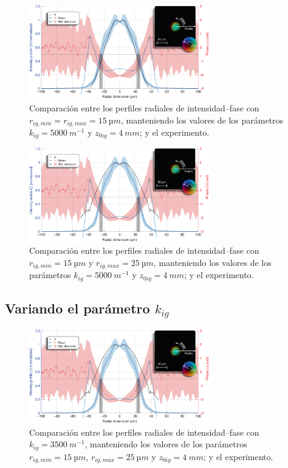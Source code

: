 \newpage

\begin{figure}[htbp]
  \centering
  \includegraphics[width=0.7\textwidth]{Figuras/anx_cmp_69.png}
  \caption*{Comparación entre los perfiles radiales de intensidad--fase con $r_{ig,min}=r_{ig,max}=\qty{15}{µm}$, manteniendo los valores de los parámetros $k_{ig}=\qty{5000}{m^{-1}}$ y $z_{0ig}=\qty{4}{mm}$; y el experimento.}
\end{figure}

\begin{figure}[htbp]
  \centering
  \includegraphics[width=0.7\textwidth]{Figuras/anx_cmp_60.png}
  \caption*{Comparación entre los perfiles radiales de intensidad--fase con $r_{ig,min}=\qty{15}{µm}$ y $r_{ig,max}=\qty{25}{µm}$, manteniendo los valores de los parámetros $k_{ig}=\qty{5000}{m^{-1}}$ y $z_{0ig}=\qty{4}{mm}$; y el experimento.}
\end{figure}

\subsection*{Variando el parámetro $k_{ig}$}

\begin{figure}[htbp!]
  \centering
  \includegraphics[width=0.7\textwidth]{Figuras/anx_cmp_71.png}
  \caption*{Comparación entre los perfiles radiales de intensidad--fase con $k_{ig}=\qty{3500}{m^{-1}}$, manteniendo los valores de los parámetros $r_{ig,min}=\qty{15}{µm}$, $r_{ig,max}=\qty{25}{µm}$ y $z_{0ig}=\qty{4}{mm}$; y el experimento.}
\end{figure}

